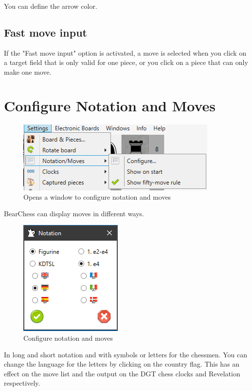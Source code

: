 \documentclass[11pt,a4paper]{article}
\begin{document}
You can define the arrow color.

\subsection{Fast move input}
If the "Fast move input" option is activated, a move is selected when you click on a target field that is only valid for one piece, or you click on a piece that can only make one move.


\section{Configure Notation and Moves}
\begin{figure}[H]
	\centering
	\includegraphics[scale=0.9]{NotationAndMoves1.png}
	\caption{Opens a window to configure notation and moves }
	\label{fig:NotationAndMoves}
\end{figure}
BearChess can display moves in different ways.
\begin{figure}[H]
	\centering
	\includegraphics[scale=1.0]{NotationAndMoves2.png}
	\caption{Configure notation and moves }
	\label{fig:NotationAndMoves2}
\end{figure}
In long and short notation and with symbols or letters for the chessmen.
You can change the language for the letters by clicking on the country flag.
This has an effect on the move list and the output on the DGT chess clocks and Revelation respectively.
\end{document}
